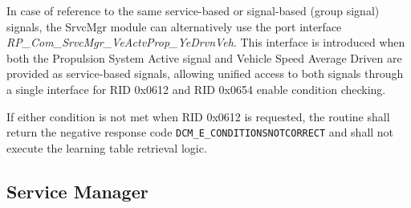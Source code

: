 {In case of reference to the same service-based or signal-based (group signal) signals, the SrvcMgr module can alternatively use the port interface \textit{RP\_Com\_SrvcMgr\_VeActvProp\_YeDrvnVeh}. This interface is introduced when both the Propulsion System Active signal and Vehicle Speed Average Driven are provided as service-based signals, allowing unified access to both signals through a single interface for RID 0x0612 and RID 0x0654 enable condition checking.

If either condition is not met when RID 0x0612 is requested, the routine shall return the negative response code \texttt{DCM\_E\_CONDITIONSNOTCORRECT} and shall not execute the learning table retrieval logic.

{   }

\subsection{Service Manager}
\label{sec:SrvcManagerDynamic}
}
